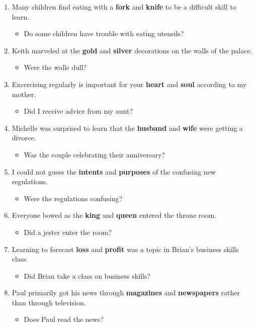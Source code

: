 \documentclass[authoryear]{elsarticle}
\begin{document}
\begin{enumerate}
\item Many children find eating with a \textbf{fork} and \textbf{knife} to be a difficult skill to learn.	\begin{itemize} \item Do some children have trouble with eating utensils?\end{itemize}
\item Keith marveled at the \textbf{gold} and \textbf{silver} decorations on the walls of the palace.	\begin{itemize} \item Were the walls dull?\end{itemize}
\item Excercising regularly is important for your \textbf{heart} and \textbf{soul} according to my mother.	\begin{itemize} \item Did I receive advice from my aunt?\end{itemize}
\item Michelle was surprised to learn that the \textbf{husband} and \textbf{wife} were getting a divorce.	\begin{itemize} \item Was the couple celebrating their anniversary?\end{itemize}
\item I could not guess the \textbf{intents} and \textbf{purposes} of the confusing new regulations.	\begin{itemize} \item Were the regulations confusing?\end{itemize}
\item Everyone bowed as the \textbf{king} and \textbf{queen} entered the throne room.	\begin{itemize} \item Did a jester enter the room?\end{itemize}
\item Learning to forecast \textbf{loss} and \textbf{profit} was a topic in Brian's business skills class.	\begin{itemize} \item Did Brian take a class on business skills?\end{itemize}
\item Paul primarily got his news through \textbf{magazines} and \textbf{newspapers} rather than through television.	\begin{itemize} \item Does Paul read the news?\end{itemize}

\end{enumerate}
\end{document}
